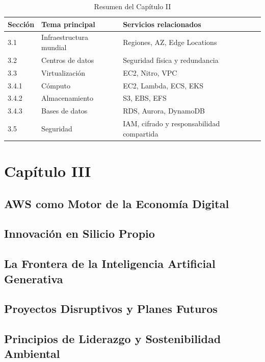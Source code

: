 \documentclass[12pt,a4paper]{article}
\begin{document}
\begin{table}[H]
\centering
\caption{Resumen del Capítulo II}
\begin{tabularx}{\textwidth}{lXX}
\toprule
\textbf{Sección} & \textbf{Tema principal} & \textbf{Servicios relacionados}\\
\midrule
3.1 & Infraestructura mundial & Regiones, AZ, Edge Locations\\

3.2 & Centros de datos & Seguridad física y redundancia\\

3.3 & Virtualización & EC2, Nitro, VPC\\

3.4.1 & Cómputo & EC2, Lambda, ECS, EKS\\

3.4.2 & Almacenamiento & S3, EBS, EFS\\

3.4.3 & Bases de datos & RDS, Aurora, DynamoDB\\

3.5 & Seguridad & IAM, cifrado y responsabilidad compartida\\
\bottomrule
\end{tabularx}
\end{table}

\newpage

\section{Capítulo III}
\subsection{AWS como Motor de la Economía Digital}
\subsection{Innovación en Silicio Propio}
\subsection{La Frontera de la Inteligencia Artificial Generativa}
\subsection{Proyectos Disruptivos y Planes Futuros}
\subsection{Principios de Liderazgo y Sostenibilidad Ambiental}
\end{document}
